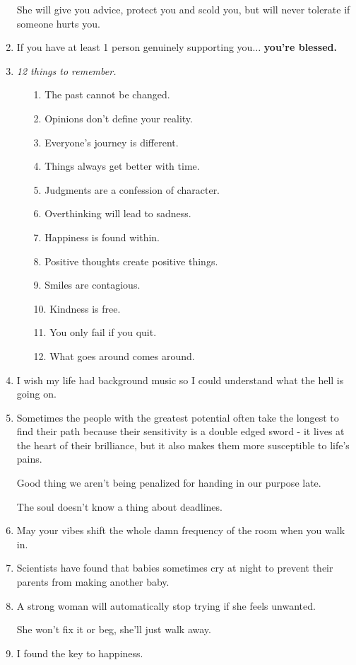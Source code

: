 \documentclass{article}
\begin{document}
\begin{enumerate}
	She will give you advice, protect you and scold you, but will never tolerate if someone hurts you.
	\item If you have at least 1 person genuinely supporting you$\ldots$ \textbf{you're blessed.}
	\item \textit{12 things to remember.}
	\begin{itemize}
		\item[1.] The past cannot be changed.
		\item[2.] Opinions don't define your reality.
		\item[3.] Everyone's journey is different.
		\item[4.] Things always get better with time.
		\item[5.] Judgments are a confession of character.
		\item[6.] Overthinking will lead to sadness.
		\item[7.] Happiness is found within.
		\item[8.] Positive thoughts create positive things.
		\item[9.] Smiles are contagious.
		\item[10.] Kindness is free.
		\item[11.] You only fail if you quit.
		\item[12.] What goes around comes around.
	\end{itemize}
	\item I wish my life had background music so I could understand what the hell is going on.
	\item Sometimes the people with the greatest potential often take the longest to find their path because their sensitivity is a double edged sword - it lives at the heart of their brilliance, but it also makes them more susceptible to life's pains.
	
	Good thing we aren't being penalized for handing in our purpose late.
	
	The soul doesn't know a thing about deadlines.
	\item May your vibes shift the whole damn frequency of the room when you walk in.
	\item Scientists have found that babies sometimes cry at night to prevent their parents from making another baby.
	\item A strong woman will automatically stop trying if she feels unwanted.
	
	She won't fix it or beg, she'll just walk away.
	\item I found the key to happiness.
	

\end{enumerate}
\end{document}
